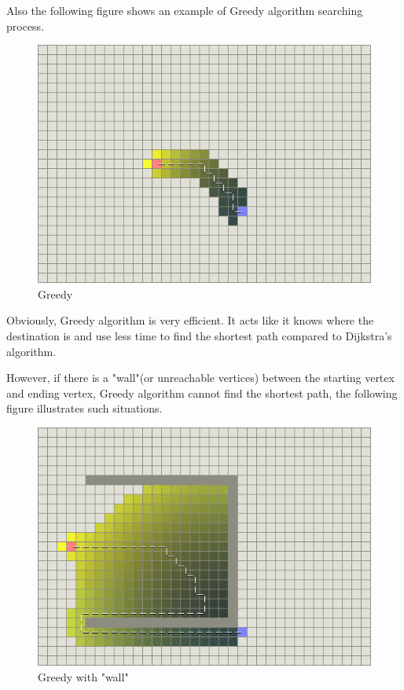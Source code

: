 \documentclass[12pt]{article}
\begin{document}
Also the following figure shows an example of Greedy algorithm searching process.
\begin{figure}[H]
    \centering 
    \includegraphics[scale = 0.6]{4.png}
    \caption{Greedy}
\end{figure}

Obviously, Greedy algorithm is very efficient. It acts like it knows where the destination is and use less time to find the shortest path compared to Dijkstra's algorithm.

However, if there is a "wall"(or unreachable vertices) between the starting vertex and ending vertex, Greedy algorithm cannot find the shortest path, the following figure illustrates such situations.

\begin{figure}[H]
    \centering 
    \includegraphics[scale = 0.6]{5.png}
    \caption{Greedy with "wall"}
\end{figure}
\end{document}
